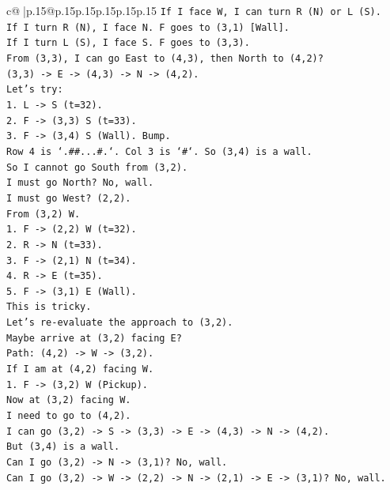 \documentclass{article}
\begin{document}
{\begin{supertabular}{c@{$\;$}|p{.15\linewidth}@{}p{.15\linewidth}p{.15\linewidth}p{.15\linewidth}p{.15\linewidth}p{.15\linewidth}}
{{{\texttt{If I face W, I can turn R (N) or L (S).} \\
\texttt{If I turn R (N), I face N. F goes to (3,1) {[}Wall{]}.} \\
\texttt{If I turn L (S), I face S. F goes to (3,3).} \\
\texttt{From (3,3), I can go East to (4,3), then North to (4,2)?} \\
\texttt{(3,3) {-}> E {-}> (4,3) {-}> N {-}> (4,2).} \\
\texttt{Let's try:} \\
\texttt{1. L {-}> S (t=32).} \\
\texttt{2. F {-}> (3,3) S (t=33).} \\
\texttt{3. F {-}> (3,4) S (Wall). Bump.} \\
\texttt{Row 4 is `.\#\#...\#.`. Col 3 is `\#`. So (3,4) is a wall.} \\
\texttt{So I cannot go South from (3,2).} \\
\texttt{I must go North? No, wall.} \\
\texttt{I must go West? (2,2).} \\
\texttt{From (3,2) W.} \\
\texttt{1. F {-}> (2,2) W (t=32).} \\
\texttt{2. R {-}> N (t=33).} \\
\texttt{3. F {-}> (2,1) N (t=34).} \\
\texttt{4. R {-}> E (t=35).} \\
\texttt{5. F {-}> (3,1) E (Wall).} \\
\texttt{This is tricky.} \\
\texttt{Let's re{-}evaluate the approach to (3,2).} \\
\texttt{Maybe arrive at (3,2) facing E?} \\
\texttt{Path: (4,2) {-}> W {-}> (3,2).} \\
\texttt{If I am at (4,2) facing W.} \\
\texttt{1. F {-}> (3,2) W (Pickup).} \\
\texttt{Now at (3,2) facing W.} \\
\texttt{I need to go to (4,2).} \\
\texttt{I can go (3,2) {-}> S {-}> (3,3) {-}> E {-}> (4,3) {-}> N {-}> (4,2).} \\
\texttt{But (3,4) is a wall.} \\
\texttt{Can I go (3,2) {-}> N {-}> (3,1)? No, wall.} \\
\texttt{Can I go (3,2) {-}> W {-}> (2,2) {-}> N {-}> (2,1) {-}> E {-}> (3,1)? No, wall.} \\
}}}
\end{supertabular}}
\end{document}

